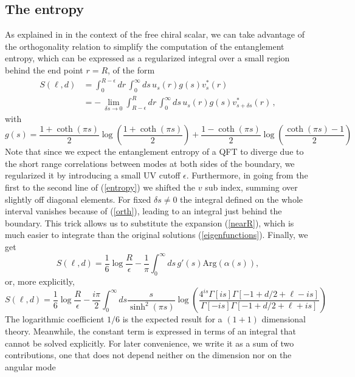 \documentclass[12pt,a4paper]{article}
\begin{document}
\subsection{The entropy}
As explained in \cite{Arias:2018tmw} in the context of the free chiral scalar, we can take advantage of the orthogonality relation to simplify the computation of the entanglement entropy, which can be expressed as a regularized integral over a small region behind the end point $r=R$, of the form
\begin{equation}\label{entropy}
\begin{split}
S(\ell,d)&=\int_0^{R-\epsilon} dr\,\int_0^{\infty} ds \,u_s(r)g(s)v_s^*(r)\\
&=-\,\lim\limits_{\delta s\rightarrow 0}\int_{R-\epsilon}^R  dr\,\int_0^{\infty} ds \,u_s(r)g(s)v_{s+\delta s}^*(r)\, ,
\end{split}
\end{equation}
with
\begin{equation}
g(s)= \frac{1+\coth(\pi s)}{2}\log\left( \frac{1+\coth(\pi s)}{2}\right)+ \frac{1-\coth(\pi s)}{2}\log\left( \frac{\coth(\pi s)-1}{2}\right)
\end{equation}
Note that since we expect the entanglement entropy of a QFT to diverge due to the short range correlations between modes at both sides of the boundary, we regularized it by introducing a small UV cutoff $\epsilon$. Furthermore, in going from the first to the second line of (\ref{entropy}) we shifted the $v$ sub index, summing over slightly off diagonal elements. For fixed $\delta s\neq 0$ the integral defined on the whole interval vanishes because of (\ref{orth}), leading to an integral just behind the boundary. This trick allows us to substitute the expansion (\ref{nearR}), which is much easier to integrate than the original solutions (\ref{eigenfunctions}). Finally, we get
\begin{equation}
S(\ell,d)=\frac{1}{6}\log{\frac{R}{\epsilon}}-\frac{1}{\pi}\int_0^{\infty} ds\,  g'(s) \text{Arg}(\alpha(s)),
\end{equation}
or, more explicitly,
\begin{equation}\label{s_l_d}
S(\ell,d)=\frac{1}{6}\log{\frac{R}{\epsilon}}-\frac{i \pi}{2}\int_0^{\infty} ds \frac{s}{\sinh^2(\pi s)}\log{\left(\frac{4^{ i s}\Gamma\left[i s\right]\Gamma\left[-1+d/2+\ell-i s\right]}{\Gamma\left[-i s\right]\Gamma\left[-1+d/2+\ell+i s\right]}\right)}
\end{equation}
The logarithmic coefficient $1/6$ is the expected result for a $(1+1)$ dimensional theory. Meanwhile, the constant term is expressed in terms of an integral that cannot be solved explicitly. For later convenience, we write it as a sum of two contributions, one that does not depend neither on the dimension nor on the angular mode
\end{document}
